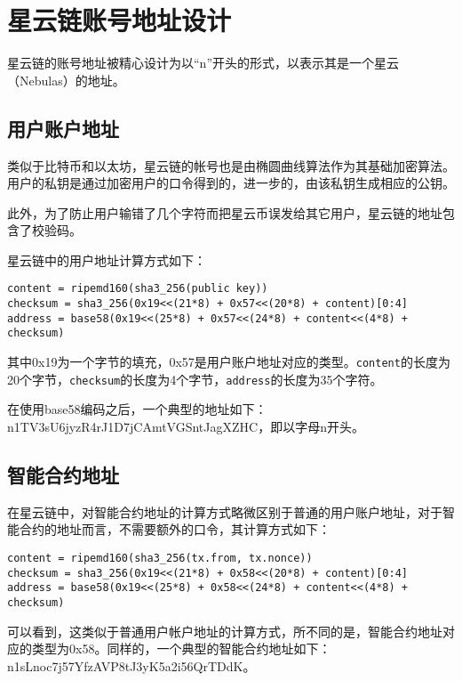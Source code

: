 \section{星云链账号地址设计}
星云链的账号地址被精心设计为以``n''开头的形式，以表示其是一个星云（Nebulas）的地址。

\subsection{用户账户地址}
类似于比特币和以太坊，星云链的帐号也是由椭圆曲线算法作为其基础加密算法。
用户的私钥是通过加密用户的口令得到的，进一步的，由该私钥生成相应的公钥。


此外，为了防止用户输错了几个字符而把星云币误发给其它用户，星云链的地址包含了校验码。

星云链中的用户地址计算方式如下：

\begin{verbatim}
content = ripemd160(sha3_256(public key))
checksum = sha3_256(0x19<<(21*8) + 0x57<<(20*8) + content)[0:4]
address = base58(0x19<<(25*8) + 0x57<<(24*8) + content<<(4*8) + checksum)
\end{verbatim}
其中0x19为一个字节的填充，0x57是用户账户地址对应的类型。\texttt{content}的长度为20个字节，\texttt{checksum}的长度为4个字节，\texttt{address}的长度为35个字符。

在使用base58编码之后，一个典型的地址如下：n1TV3sU6jyzR4rJ1D7jCAmtVGSntJagXZHC，即以字母n开头。



\subsection{智能合约地址}
在星云链中，对智能合约地址的计算方式略微区别于普通的用户账户地址，对于智能合约的地址而言，不需要额外的口令，其计算方式如下：

\begin{verbatim}
content = ripemd160(sha3_256(tx.from, tx.nonce))
checksum = sha3_256(0x19<<(21*8) + 0x58<<(20*8) + content)[0:4]
address = base58(0x19<<(25*8) + 0x58<<(24*8) + content<<(4*8) + checksum)
\end{verbatim}
\noindent
可以看到，这类似于普通用户帐户地址的计算方式，所不同的是，智能合约地址对应的类型为0x58。同样的，一个典型的智能合约地址如下：
n1sLnoc7j57YfzAVP8tJ3yK5a2i56QrTDdK。

